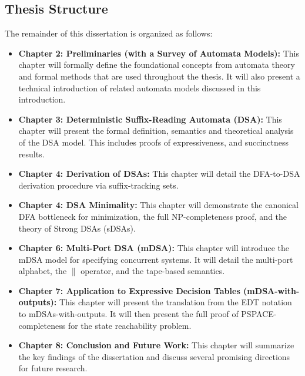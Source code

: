 \subsection*{Thesis Structure}
The remainder of this dissertation is organized as follows:
\begin{itemize}
    \item \textbf{Chapter 2: Preliminaries (with a Survey of Automata Models):} This chapter will formally define the foundational concepts from automata theory and formal methods that are used throughout the thesis. It will also present a technical introduction of related automata models discussed in this introduction.
    \item \textbf{Chapter 3: Deterministic Suffix-Reading Automata (DSA):} This chapter will present the formal definition, semantics and theoretical analysis of the DSA model. This includes proofs of expressiveness, and succinctness results.
    \item \textbf{Chapter 4: Derivation of DSAs:} This chapter will detail the DFA-to-DSA derivation procedure via suffix-tracking sets.
    \item \textbf{Chapter 4: DSA Minimality:} This chapter will demonstrate the canonical DFA bottleneck for minimization, the full NP-completeness proof, and the theory of Strong DSAs (sDSAs).
    \item \textbf{Chapter 6: Multi-Port DSA (mDSA):} This chapter will introduce the mDSA model for specifying concurrent systems. It will detail the multi-port alphabet, the $\parallel$ operator, and the tape-based semantics.
    \item \textbf{Chapter 7: Application to Expressive Decision Tables (mDSA-with-outputs):} This chapter will present the translation from the EDT notation to mDSAs-with-outputs. It will then present the full proof of PSPACE-completeness for the state reachability problem.
    \item \textbf{Chapter 8: Conclusion and Future Work:} This chapter will summarize the key findings of the dissertation and discuss several promising directions for future research.
\end{itemize}

%
%
%

